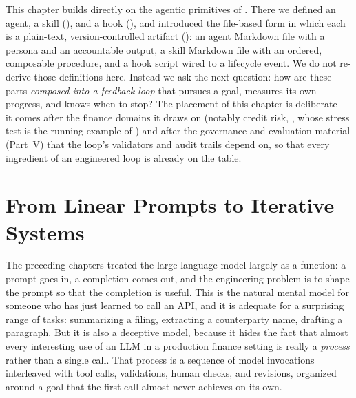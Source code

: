 \begin{context}
This chapter builds directly on the agentic primitives of
. There we defined an agent, a skill (), and a
hook (), and introduced the file-based form in which each is a
plain-text, version-controlled artifact (): an agent
Markdown file with a persona and an accountable output, a skill Markdown file with an
ordered, composable procedure, and a hook script wired to a lifecycle event. We do not
re-derive those definitions here. Instead we ask the next question: how are these parts
\emph{composed into a feedback loop} that pursues a goal, measures its own progress, and
knows when to stop? The placement of this chapter is deliberate---it comes after the
finance domains it draws on (notably credit risk, , whose stress
test is the running example of ) and after the governance
and evaluation material (Part~V) that the loop's validators and audit trails depend on,
so that every ingredient of an engineered loop is already on the table.
\end{context}


\section{From Linear Prompts to Iterative Systems}\label{sec:from-linear-to-iterative}

The preceding chapters treated the large language model largely as a function: a prompt goes in, a completion comes out, and the engineering problem is to shape the prompt so that the completion is useful. This is the natural mental model for someone who has just learned to call an API, and it is adequate for a surprising range of tasks: summarizing a filing, extracting a counterparty name, drafting a paragraph. But it is also a deceptive model, because it hides the fact that almost every interesting use of an LLM in a production finance setting is really a \emph{process} rather than a single call. That process is a sequence of model invocations interleaved with tool calls, validations, human checks, and revisions, organized around a goal that the first call almost never achieves on its own.

